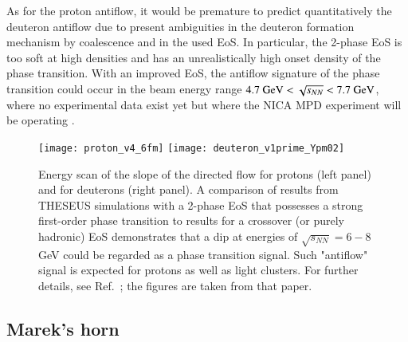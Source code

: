 \documentclass{webofc}
\begin{document}
As for the proton antiflow, it would be premature to predict quantitatively the deuteron antiflow due to present ambiguities in the deuteron formation mechanism by coalescence and in the used EoS.
In particular, the 2-phase EoS is too soft at high densities and has an unrealistically high onset density of the phase transition. With an improved EoS, the antiflow signature of the phase transition could occur in the beam energy range $4.7~{\rm GeV}<\sqrt{s_{NN}}<7.7~{\rm GeV}$, where no experimental data exist yet but where the NICA MPD experiment will be operating \cite{Kekelidze:2016hhw}.
 
\begin{figure}[!htb]
\centering
\sidecaption
\texttt{[image: proton\_v4\_6fm]}
\texttt{[image: deuteron\_v1prime\_Ypm02]}
\caption{Energy scan of the slope of the directed flow for protons (left panel) and for deuterons (right panel). A comparison of results from THESEUS simulations with a 2-phase EoS that possesses a strong first-order phase transition to results for a crossover (or purely hadronic) EoS demonstrates that a dip at energies of
$\sqrt{s_{NN}}=6-8$ GeV could be regarded as a phase transition signal. Such "antiflow" signal is expected for protons as well as light clusters. For further details, see Ref.~\cite{4}; the figures are taken from that paper.}
\label{fig-6}       %
\end{figure}


\subsection{Marek's horn }
\end{document}
